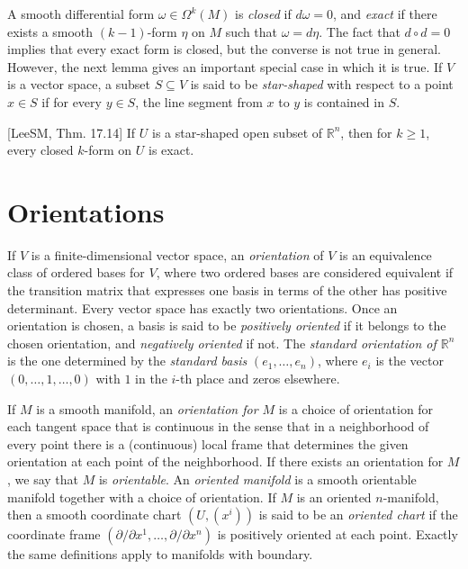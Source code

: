A smooth differential form $\omega \in \Omega^k(M)$ is \emph{closed} if $d\omega = 0$, and \emph{exact} if there exists a smooth $(k-1)$-form $\eta$ on $M$ such that $\omega = d\eta$. The fact that $d \circ d = 0$ implies that every exact form is closed, but the converse is not true in general. However, the next lemma gives an important special case in which it is true. If $V$ is a vector space, a subset $S \subseteq V$ is said to be \emph{star-shaped} with respect to a point $x \in S$ if for every $y \in S$, the line segment from $x$ to $y$ is contained in $S$.

\begin{lemma}
\label{lem:poincare-lemma}
[LeeSM, Thm. 17.14] If $U$ is a star-shaped open subset of $\mathbb{R}^n$, then for $k \geq 1$, every closed $k$-form on $U$ is exact.
\end{lemma}

\section{Orientations}

If $V$ is a finite-dimensional vector space, an \emph{orientation} of $V$ is an equivalence class of ordered bases for $V$, where two ordered bases are considered equivalent if the transition matrix that expresses one basis in terms of the other has positive determinant. Every vector space has exactly two orientations. Once an orientation is chosen, a basis is said to be \textit{positively oriented} if it belongs to the chosen orientation, and \textit{negatively oriented} if not. The \textit{standard orientation of $\mathbb{R}^n$} is the one determined by the \textit{standard basis} $(e_1, \ldots, e_n)$, where $e_i$ is the vector $(0, \ldots, 1, \ldots, 0)$ with $1$ in the $i$-th place and zeros elsewhere.

If $M$ is a smooth manifold, an \textit{orientation for $M$} is a choice of orientation for each tangent space that is continuous in the sense that in a neighborhood of every point there is a (continuous) local frame that determines the given orientation at each point of the neighborhood. If there exists an orientation for $M$, we say that $M$ is \textit{orientable}. An \textit{oriented manifold} is a smooth orientable manifold together with a choice of orientation. If $M$ is an oriented $n$-manifold, then a smooth coordinate chart $(U, (x^i))$ is said to be an \textit{oriented chart} if the coordinate frame $(\partial/\partial x^1, \ldots, \partial/\partial x^n)$ is positively oriented at each point. Exactly the same definitions apply to manifolds with boundary.

